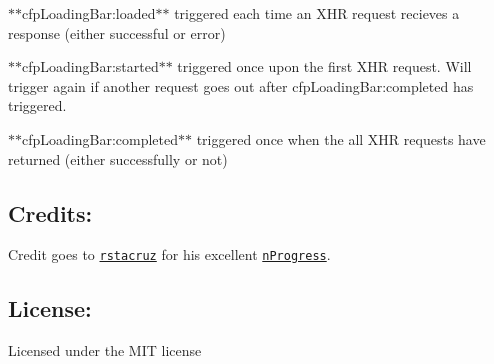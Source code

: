 $\ast$$\ast${\ttfamily cfp\+Loading\+Bar\+:loaded}$\ast$$\ast$ triggered each time an X\+HR request recieves a response (either successful or error)

$\ast$$\ast${\ttfamily cfp\+Loading\+Bar\+:started}$\ast$$\ast$ triggered once upon the first X\+HR request. Will trigger again if another request goes out after {\ttfamily cfp\+Loading\+Bar\+:completed} has triggered.

$\ast$$\ast${\ttfamily cfp\+Loading\+Bar\+:completed}$\ast$$\ast$ triggered once when the all X\+HR requests have returned (either successfully or not)

\subsection*{Credits\+:}

Credit goes to \href{https://github.com/rstacruz}{\tt rstacruz} for his excellent \href{https://github.com/rstacruz/nprogress}{\tt n\+Progress}.

\subsection*{License\+:}

Licensed under the M\+IT license 